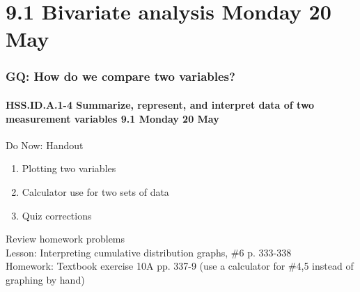 \documentclass{beamer}
\begin{document}
\section{9.1 Bivariate analysis Monday 20 May}
  \frame
  {
    \frametitle{GQ: How do we compare two variables?}
    \framesubtitle{HSS.ID.A.1-4 Summarize, represent, and interpret data of two measurement variables \hfill \alert{9.1 Monday 20 May}}

    \begin{block}{Do Now: Handout}
        \begin{enumerate}
          \item Plotting two variables
          \item Calculator use for two sets of data
          \item Quiz corrections
      \end{enumerate}
    \end{block}
    Review homework problems\\
    Lesson: Interpreting cumulative distribution graphs, \#6 p. 333-338\\[0.5cm]
    Homework: Textbook exercise 10A pp. 337-9 (use a calculator for \#4,5 instead of graphing by hand)
  }
\end{document}
